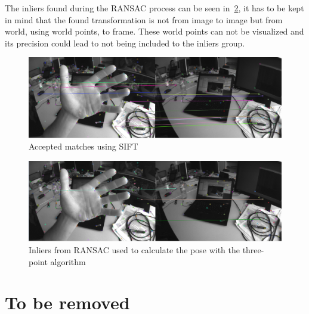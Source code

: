 The inliers found during the RANSAC process can be seen in~\ref{fig:3pt_inliers}, it has to be kept in mind that the found transformation is not from image to image but from world, using world points, to frame. These world points can not be visualized and its precision could lead to not being included to the inliers group.\\

\begin{figure}[htpb]
  \centering
  \includegraphics[width=1.0\linewidth]{img/3pt_matches_1.png}
  \caption{Accepted matches using SIFT}
  \label{fig:3pt_matches}
\end{figure}


\begin{figure}[htpb]
  \centering
  \includegraphics[width=1.0\linewidth]{img/3pt_inliers_1.png}
  \caption{Inliers from RANSAC used to calculate the pose with the three-point algorithm }
  \label{fig:3pt_inliers}
\end{figure}
































\chapter{To be removed}
\label{cha:chapter_name}



